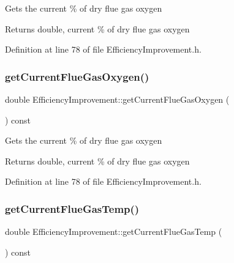 Gets the current \% of dry flue gas oxygen

\begin{DoxyReturn}{Returns}
double, current \% of dry flue gas oxygen 
\end{DoxyReturn}


Definition at line 78 of file Efficiency\+Improvement.\+h.

\mbox{\label{class_efficiency_improvement_a8b66a676d696f7a9fcc8fa987371d80b}} 
\subsubsection{\texorpdfstring{get\+Current\+Flue\+Gas\+Oxygen()}{getCurrentFlueGasOxygen()}\hspace{0.1cm}{\footnotesize\ttfamily [3/3]}}
{\footnotesize\ttfamily double Efficiency\+Improvement\+::get\+Current\+Flue\+Gas\+Oxygen (\begin{DoxyParamCaption}{ }\end{DoxyParamCaption}) const\hspace{0.3cm}{\ttfamily [inline]}}

Gets the current \% of dry flue gas oxygen

\begin{DoxyReturn}{Returns}
double, current \% of dry flue gas oxygen 
\end{DoxyReturn}


Definition at line 78 of file Efficiency\+Improvement.\+h.

\mbox{\label{class_efficiency_improvement_a27e97b5c7aad8aa6b4d02e18354d2292}} 
\subsubsection{\texorpdfstring{get\+Current\+Flue\+Gas\+Temp()}{getCurrentFlueGasTemp()}\hspace{0.1cm}{\footnotesize\ttfamily [1/3]}}
{\footnotesize\ttfamily double Efficiency\+Improvement\+::get\+Current\+Flue\+Gas\+Temp (\begin{DoxyParamCaption}{ }\end{DoxyParamCaption}) const\hspace{0.3cm}{\ttfamily [inline]}}

